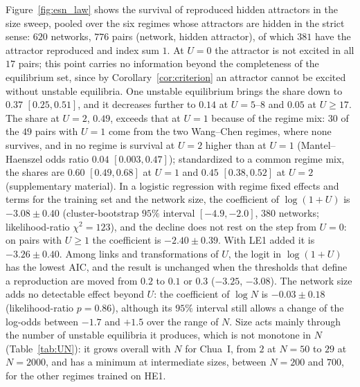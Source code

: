 Figure~\ref{fig:esn_law} shows the survival of reproduced hidden attractors in the size sweep, pooled over the six regimes
whose attractors are hidden in the strict sense: $620$ networks, $776$ pairs (network, hidden attractor), of which $381$ have
the attractor reproduced and index sum $1$. At $U=0$ the attractor is not excited in all $17$ pairs; this point carries no
information beyond the completeness of the equilibrium set, since by Corollary~\ref{cor:criterion} an attractor cannot be
excited without unstable equilibria. One unstable equilibrium brings the share down to $0.37$ $[0.25, 0.51]$, and it
decreases further to $0.14$ at $U=5$--$8$ and $0.05$ at $U\ge17$. The share at $U=2$, $0.49$, exceeds that at $U=1$ because
of the regime mix: $30$ of the $49$ pairs with $U=1$ come from the two Wang--Chen regimes, where none survives, and in no
regime is survival at $U=2$ higher than at $U=1$ (Mantel--Haenszel odds ratio $0.04$ $[0.003, 0.47]$); standardized to
a common regime mix, the shares are $0.60$ $[0.49,0.68]$ at $U=1$ and $0.45$ $[0.38,0.52]$ at $U=2$ (supplementary
material). In a logistic regression with regime fixed effects and terms for the training set and the network size, the
coefficient of $\log(1+U)$ is $-3.08\pm0.40$ (cluster-bootstrap $95\%$ interval $[-4.9,-2.0]$, $380$ networks;
likelihood-ratio $\chi^2=123$), and the decline does not rest on the step from $U=0$: on pairs with $U\ge1$ the coefficient
is $-2.40\pm0.39$. With LE1 added it is $-3.26\pm0.40$. Among links and transformations of $U$, the logit in $\log(1+U)$
has the lowest AIC, and the result is unchanged when the thresholds that define a reproduction are moved from $0.2$ to
$0.1$ or $0.3$ ($-3.25$, $-3.08$). The
network size adds no detectable effect beyond $U$: the coefficient of $\log N$ is $-0.03\pm0.18$ (likelihood-ratio
$p=0.86$), although its $95\%$ interval still allows a change of the log-odds between $-1.7$ and $+1.5$ over the range of
$N$. Size acts mainly through the number of unstable equilibria it produces, which is not monotone in $N$
(Table~\ref{tab:UN}): it grows overall with $N$ for Chua~I, from $2$ at $N=50$ to $29$ at $N=2000$, and has a minimum at
intermediate sizes, between $N=200$ and $700$, for the other regimes trained on HE1.


